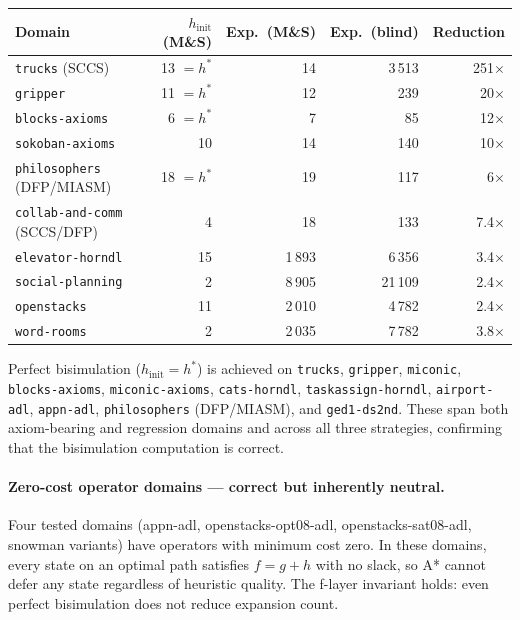 \documentclass[11pt,a4paper]{article}
\begin{document}
\begin{center}
\small
\begin{tabular}{lrrrr}
\toprule
\textbf{Domain} & \textbf{$h_{\mathrm{init}}$ (M\&S)} & \textbf{Exp.\ (M\&S)}
  & \textbf{Exp.\ (blind)} & \textbf{Reduction} \\
\midrule
\texttt{trucks} (SCCS)      & 13 $= h^*$ & 14      & 3\,513  & 251$\times$ \\
\texttt{gripper}            & 11 $= h^*$ & 12      & 239     &  20$\times$ \\
\texttt{blocks-axioms}      & 6  $= h^*$ & 7       & 85      &  12$\times$ \\
\texttt{sokoban-axioms}     & 10         & 14      & 140     &  10$\times$ \\
\texttt{philosophers} (DFP/MIASM) & 18 $= h^*$ & 19 & 117   &   6$\times$ \\
\texttt{collab-and-comm} (SCCS/DFP) & 4  & 18    & 133     & 7.4$\times$ \\
\texttt{elevator-horndl}    & 15         & 1\,893  & 6\,356  & 3.4$\times$ \\
\texttt{social-planning}    & 2          & 8\,905  & 21\,109 & 2.4$\times$ \\
\texttt{openstacks}         & 11         & 2\,010  & 4\,782  & 2.4$\times$ \\
\texttt{word-rooms}         & 2          & 2\,035  & 7\,782  & 3.8$\times$ \\
\bottomrule
\end{tabular}
\end{center}

Perfect bisimulation ($h_{\mathrm{init}} = h^*$) is achieved on
\texttt{trucks}, \texttt{gripper}, \texttt{miconic}, \texttt{blocks-axioms},
\texttt{miconic-axioms}, \texttt{cats-horndl}, \texttt{taskassign-horndl},
\texttt{airport-adl}, \texttt{appn-adl}, \texttt{philosophers} (DFP/MIASM),
and \texttt{ged1-ds2nd}.
These span both axiom-bearing and regression domains and across all three
strategies, confirming that the bisimulation computation is correct.

\paragraph{Zero-cost operator domains — correct but inherently neutral.}

Four tested domains (appn-adl, openstacks-opt08-adl, openstacks-sat08-adl,
snowman variants) have operators with minimum cost zero.  In these domains,
every state on an optimal path satisfies $f = g + h$ with no slack, so
A* cannot defer any state regardless of heuristic quality.  The f-layer
invariant holds: even perfect bisimulation does not reduce expansion count.
\end{document}
